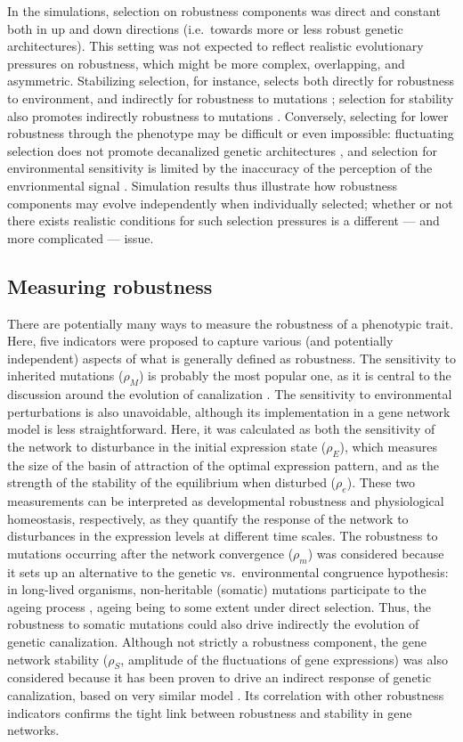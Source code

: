 \documentclass[10pt,a4paper]{article}
\newcommand{\stability}{{\rho_S}}
\newcommand{\earlyenv}{{\rho_E}}
\newcommand{\lateenv}{{\rho_e}}
\newcommand{\earlymut}{{\rho_M}}
\newcommand{\latemut}{{\rho_m}}
\begin{document}
In the simulations, selection on robustness components was direct and constant both in up and down directions (i.e.\ towards more or less robust genetic architectures). This setting was not expected to reflect realistic evolutionary pressures on robustness, which might be more complex, overlapping, and asymmetric. Stabilizing selection, for instance, selects both directly for robustness to environment, and indirectly for robustness to mutations \citep{WBB97}; selection for stability also promotes indirectly robustness to mutations \citep{SB02}. Conversely, selecting for lower robustness through the phenotype may be difficult or even impossible: fluctuating selection does not promote decanalized genetic architectures \citep{LAH13}, and selection for environmental sensitivity is limited by the inaccuracy of the perception of the envrionmental signal \citep{RWS+10}. Simulation results thus illustrate how robustness components may evolve independently when individually selected; whether or not there exists realistic conditions for such selection pressures is a different --- and more complicated --- issue. 

\subsection{Measuring robustness}

There are potentially many ways to measure the robustness of a phenotypic trait. Here, five indicators were proposed to capture various (and potentially independent) aspects of what is generally defined as robustness. The sensitivity to inherited mutations ($\earlymut$) is probably the most popular one, as it is central to the discussion around the evolution of canalization \citep{Wad59, Wag96, Far15}. The sensitivity to environmental perturbations is also unavoidable, although its implementation in a gene network model is less straightforward. Here, it was calculated as both the sensitivity of the network to disturbance in the initial expression state ($\earlyenv$), which measures the size of the basin of attraction of the optimal expression pattern, and as the strength of the stability of the equilibrium when disturbed ($\lateenv$). These two measurements can be interpreted as developmental robustness and physiological homeostasis, respectively, as they quantify the response of the network to disturbances in the expression levels at different time scales. The robustness to mutations occurring after the network convergence ($\latemut$) was considered because it sets up an alternative to the genetic vs.\ environmental congruence hypothesis: in long-lived organisms, non-heritable (somatic) mutations participate to the ageing process \citep{KLH12}, ageing being to some extent under direct selection. Thus, the robustness to somatic mutations could also drive indirectly the evolution of genetic canalization. Although not strictly a robustness component, the gene network stability ($\stability$, amplitude of the fluctuations of gene expressions) was also considered because it has been proven to drive an indirect response of genetic canalization, based on very similar model \citep{SB02}. Its correlation with other robustness indicators confirms the tight link between robustness and stability in gene networks.
\end{document}
